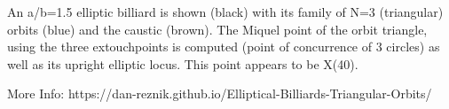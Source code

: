 An a/b=1.5 elliptic billiard is shown (black) with its family of N=3 (triangular) orbits (blue) and the caustic (brown). The Miquel point of the orbit triangle, using the three extouchpoints is computed (point of concurrence of 3 circles) as well as its upright elliptic locus. This point appears to be X(40).

More Info:  https://dan-reznik.github.io/Elliptical-Billiards-Triangular-Orbits/